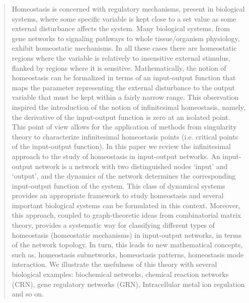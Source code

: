 \documentclass[a4paper,fleqn]{cas-dc}
\begin{document}
\begin{abstract}
Homeostasis is concerned with regulatory mechanisms, present in biological systems, where some specific variable is kept close to a set value as some external disturbance affects the system. 
Many biological systems, from gene networks to signaling pathways to whole tissue/organism physiology, exhibit homeostatic mechanisms. 
In all these cases there are homeostatic regions where the variable is relatively to insensitive external stimulus, flanked by regions where it is sensitive. 
Mathematically, the notion of homeostasis can be formalized in terms of an input-output function that maps the parameter representing the external disturbance to the output variable that must be kept within a fairly narrow range. 
This observation inspired the introduction of the notion of infinitesimal homeostasis, namely, the derivative of the input-output function is zero at an isolated point. 
This point of view allows for the application of methods from singularity theory to characterize infinitesimal homeostasis points (i.e. critical points of the input-output function). 
In this paper we review the infinitesimal approach to the study of homeostasis in input-output networks. 
An input-output network is a network with two distinguished nodes ‘input’ and ‘output’, and the dynamics of the network determines the corresponding input-output function of the system. 
This class of dynamical systems provides an appropriate framework to study homeostasis and several important biological systems can be formulated in this context. 
Moreover, this approach, coupled to graph-theoretic ideas from combinatorial matrix theory, provides a systematic way for classifying different types of homeostasis (homeostatic mechanisms) in input-output networks, in terms of the network topology. 
In turn, this leads to new mathematical concepts, such as, homeostasis subnetworks, homeostasis patterns, homeostasis mode interaction. 
We illustrate the usefulness of this theory with several biological examples: biochemical networks, chemical reaction networks (CRN), gene regulatory networks (GRN), Intracellular metal ion regulation and so on.
\end{abstract}


\end{document}

